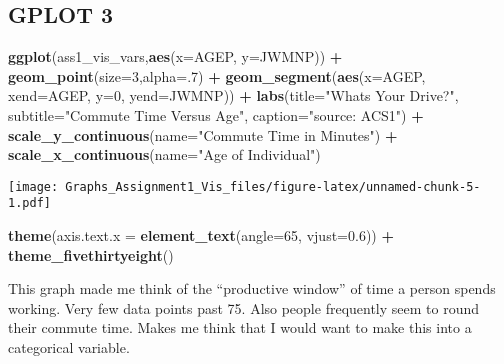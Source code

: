 \documentclass[
]{article}
\newenvironment{Shaded}{\begin{snugshade}}{\end{snugshade}}
\newcommand{\DataTypeTok}[1]{\textcolor[rgb]{0.13,0.29,0.53}{#1}}
\newcommand{\DecValTok}[1]{\textcolor[rgb]{0.00,0.00,0.81}{#1}}
\newcommand{\FloatTok}[1]{\textcolor[rgb]{0.00,0.00,0.81}{#1}}
\newcommand{\KeywordTok}[1]{\textcolor[rgb]{0.13,0.29,0.53}{\textbf{#1}}}
\newcommand{\NormalTok}[1]{#1}
\newcommand{\OperatorTok}[1]{\textcolor[rgb]{0.81,0.36,0.00}{\textbf{#1}}}
\newcommand{\StringTok}[1]{\textcolor[rgb]{0.31,0.60,0.02}{#1}}
\begin{document}
\hypertarget{gplot-3}{%
\subsection{GPLOT 3}\label{gplot-3}}

\begin{Shaded}
\begin{Highlighting}[]
\KeywordTok{ggplot}\NormalTok{(ass1_vis_vars,}\KeywordTok{aes}\NormalTok{(}\DataTypeTok{x=}\NormalTok{AGEP, }\DataTypeTok{y=}\NormalTok{JWMNP)) }\OperatorTok{+}
\StringTok{  }\KeywordTok{geom_point}\NormalTok{(}\DataTypeTok{size=}\DecValTok{3}\NormalTok{,}\DataTypeTok{alpha=}\NormalTok{.}\DecValTok{7}\NormalTok{) }\OperatorTok{+}\StringTok{ }
\StringTok{  }\KeywordTok{geom_segment}\NormalTok{(}\KeywordTok{aes}\NormalTok{(}\DataTypeTok{x=}\NormalTok{AGEP, }
                   \DataTypeTok{xend=}\NormalTok{AGEP, }
                   \DataTypeTok{y=}\DecValTok{0}\NormalTok{, }
                   \DataTypeTok{yend=}\NormalTok{JWMNP)) }\OperatorTok{+}\StringTok{ }
\StringTok{  }\KeywordTok{labs}\NormalTok{(}\DataTypeTok{title=}\StringTok{"Whats Your Drive?"}\NormalTok{, }
       \DataTypeTok{subtitle=}\StringTok{"Commute Time Versus Age"}\NormalTok{, }
       \DataTypeTok{caption=}\StringTok{"source: ACS1"}\NormalTok{) }\OperatorTok{+}\StringTok{ }
\StringTok{  }\KeywordTok{scale_y_continuous}\NormalTok{(}\DataTypeTok{name=}\StringTok{"Commute Time in Minutes"}\NormalTok{) }\OperatorTok{+}
\StringTok{  }\KeywordTok{scale_x_continuous}\NormalTok{(}\DataTypeTok{name=}\StringTok{"Age of Individual"}\NormalTok{)}
\end{Highlighting}
\end{Shaded}

\texttt{[image: Graphs\_Assignment1\_Vis\_files/figure-latex/unnamed-chunk-5-1.pdf]}

\begin{Shaded}
\begin{Highlighting}[]
  \KeywordTok{theme}\NormalTok{(}\DataTypeTok{axis.text.x =} \KeywordTok{element_text}\NormalTok{(}\DataTypeTok{angle=}\DecValTok{65}\NormalTok{, }\DataTypeTok{vjust=}\FloatTok{0.6}\NormalTok{)) }\OperatorTok{+}
\StringTok{    }\KeywordTok{theme_fivethirtyeight}\NormalTok{()}
\end{Highlighting}
\end{Shaded}

This graph made me think of the ``productive window'' of time a person
spends working. Very few data points past 75. Also people frequently
seem to round their commute time. Makes me think that I would want to
make this into a categorical variable.
\end{document}
